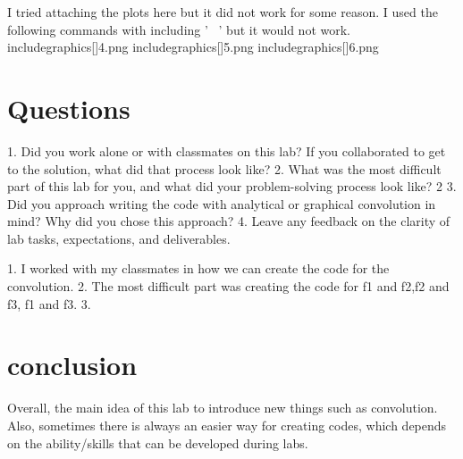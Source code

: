 \documentclass[12pt]{report}
\begin{document}
I tried attaching the plots here but it did not work for some reason. I used the following commands with including ' \ ' but it would not work.
includegraphics[]{4.png}
includegraphics[]{5.png}
includegraphics[]{6.png}




\section{Questions}

1. Did you work alone or with classmates on this lab? If you collaborated to get to the solution,
what did that process look like?
2. What was the most difficult part of this lab for you, and what did your problem-solving
process look like?
2
3. Did you approach writing the code with analytical or graphical convolution in mind? Why
did you chose this approach?
4. Leave any feedback on the clarity of lab tasks, expectations, and deliverables.

1. I worked with my classmates in how we can create the code for the convolution.
2. The most difficult part was creating the code for f1 and f2,f2 and f3, f1 and f3.
3.



\section{conclusion}


Overall, the main idea of this lab to introduce new things such as convolution. Also, sometimes there is always an easier way for creating codes, which depends on the ability/skills that can be developed during labs.

\newpage
\end{document}
